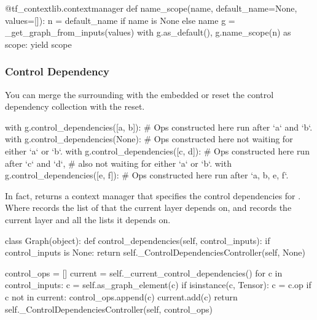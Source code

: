 \begin{content}
\begin{leftbar}
\begin{python}
@tf_contextlib.contextmanager
def name_scope(name, default_name=None, values=[]):
  n = default_name if name is None else name
  g = _get_graph_from_inputs(values)
  with g.as_default(), g.name_scope(n) as scope:
    yield scope
\end{python}
\end{leftbar}


\subsubsection{Control Dependency}
You can merge the surrounding  with the embedded  or reset the control dependency collection with the  reset.

\begin{leftbar}
\begin{python}
with g.control_dependencies([a, b]):
  # Ops constructed here run after `a` and `b`.
  with g.control_dependencies(None):
    # Ops constructed here not waiting for either `a` or `b`.
    with g.control_dependencies([c, d]):
      # Ops constructed here run after `c` and `d`, 
      # also not waiting for either `a` or `b`.
  with g.control_dependencies([e, f]):
    # Ops constructed here run after `a, b, e, f`.
\end{python}
\end{leftbar}

In fact,  returns a context manager that specifies the control dependencies for . Where  records the list of  that the current layer depends on, and  records the current layer and all the  lists it depends on.

\begin{leftbar}
\begin{python}
class Graph(object):
  def control_dependencies(self, control_inputs):
    if control_inputs is None:
      return self._ControlDependenciesController(self, None)

    control_ops = []
    current = self._current_control_dependencies()
    for c in control_inputs:
      c = self.as_graph_element(c)
      if isinstance(c, Tensor):
        c = c.op
      if c not in current:
        control_ops.append(c)
        current.add(c)
    return self._ControlDependenciesController(self, control_ops)
\end{python}
\end{leftbar}


\end{content}
